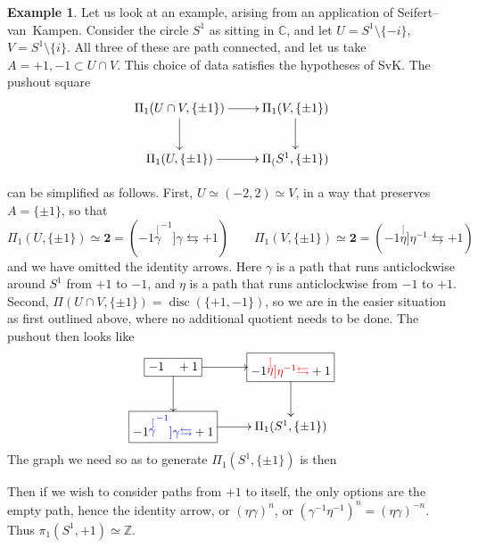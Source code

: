 \documentclass{tufte-handout}
\def\ZZ{\mathbb{Z}}
\def\CC{\mathbb{C}}
\DeclareMathOperator{\disc}{disc}
\theoremstyle{definition}
\newtheorem{example}{Example}
\begin{document}
\begin{example}

Let us look at an example, arising from an application of Seifert--van~Kampen. Consider 
the circle $S^1$ as sitting in $\CC$, and let $U=S^1\setminus \{-i\}$, $V=S^1\setminus 
\{i\}$. All three of these are path connected, and let us take $A={+1,-1} \subset U\cap 
V$. This choice of data satisfies the hypotheses of SvK. The pushout square
\[
\xymatrix{
	\Pi_1(U\cap V,\{\pm1\}) \ar[r] \ar[d] & \Pi_1(V,\{\pm1\}) \ar[d]\\
	\Pi_1(U,\{\pm1\}) \ar[r] & \Pi_(S^1,\{\pm1\})
}
\]

can be simplified as follows. First, $U \simeq (-2,2) \simeq V$, in a way that preserves 
$A=\{\pm1\}$, so that 
\[
\Pi_1(U,\{\pm1\})  \simeq \mathbf{2} = (-1 \stackrel[\gamma^{-1}]{\gamma}{\leftrightarrows} +1)
\qquad \Pi_1(V,\{\pm1\})  \simeq \mathbf{2} = (-1 \stackrel[\eta]{\eta^{-1}}{\leftrightarrows} +1)
\]
and we have omitted the identity arrows. Here $\gamma$ is a path that runs anticlockwise around $S^1$ from $+1$ to $-1$, and $\eta$ is a path that runs anticlockwise from $-1$ to $+1$.
Second, $\Pi(U\cap V,\{\pm1\}) = \disc(\{+1,-1\})$, so
we are in the easier situation as first outlined above, where no additional quotient needs
to be done. The pushout then looks like
\[
\xymatrix{
*+[F]{-1\phantom{\leftrightarrows}+1} \ar[r] \ar[d] 
& 
*+[F]{-1 {\color{red}\stackrel[\eta]{\eta^{-1}}{\leftrightarrows}} +1}\ar[d] 
\\
*+[F]{-1 {\color{blue}\stackrel[\gamma^{-1}]{\gamma}{\leftrightarrows}} +1} \ar[r] &
\Pi_1(S^1,\{\pm1\})
}
\]
The graph we need so as to generate $\Pi_1(S^1,\{\pm1\})$ is then
\begin{center}
\end{center}

Then if we wish to consider paths from $+1$ to itself, the only options are the empty 
path, hence the identity arrow, or $(\eta\gamma)^n$, or $(\gamma^{-1}\eta^{-1})^n = 
(\eta\gamma)^{-n}$. Thus $\pi_1(S^1,+1) \simeq \ZZ$.
\end{example}
\end{document}
